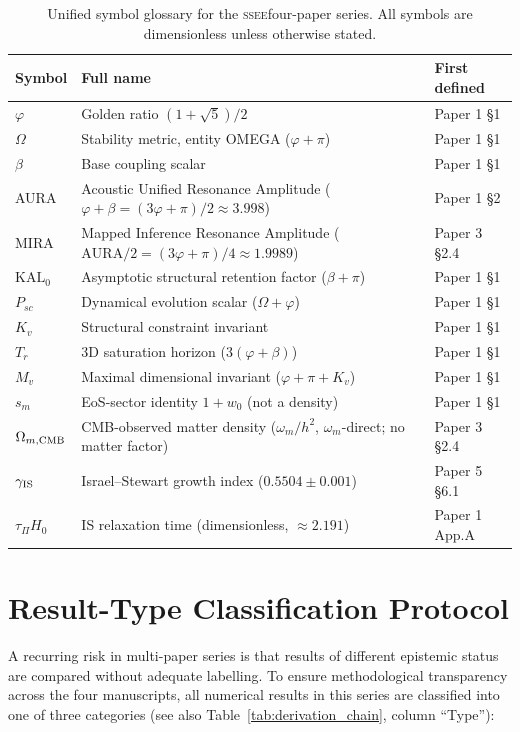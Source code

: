 \documentclass[12pt,a4paper]{article}
\newcommand{\SSEE}{\ifmmode\mathrm{SSEE}\else\textsc{ssee}\fi}
\begin{document}
\begin{table}[H]
\centering
\caption{Unified symbol glossary for the \SSEE four-paper series.
  All symbols are dimensionless unless otherwise stated.}
\label{tab:notation}
\footnotesize
\begin{tabularx}{\textwidth}{p{2.2cm}Xp{2.8cm}}
\toprule
Symbol & Full name & First defined \\
\midrule
$\varphi$ & Golden ratio $(1+\sqrt{5})/2$ & Paper 1 §1 \\
$\Omega$ & Stability metric, entity OMEGA ($\varphi+\pi$) & Paper 1 §1 \\
$\beta$ & Base coupling scalar & Paper 1 §1 \\
AURA & Acoustic Unified Resonance Amplitude ($\varphi+\beta=(3\varphi+\pi)/2\approx3.998$) & Paper 1 §2 \\
MIRA & Mapped Inference Resonance Amplitude ($\mathrm{AURA}/2=(3\varphi+\pi)/4\approx1.9989$) & Paper 3 §2.4 \\
$\mathrm{KAL}_0$ & Asymptotic structural retention factor ($\beta+\pi$) & Paper 1 §1 \\
$P_{sc}$ & Dynamical evolution scalar ($\Omega+\varphi$) & Paper 1 §1 \\
$K_v$ & Structural constraint invariant & Paper 1 §1 \\
$T_r$ & 3D saturation horizon ($3(\varphi+\beta)$) & Paper 1 §1 \\
$M_v$ & Maximal dimensional invariant ($\varphi+\pi+K_v$) & Paper 1 §1 \\
$s_m$ & EoS-sector identity $1+w_0$ (not a density) & Paper 1 §1 \\
$\Omega_{m,\rm CMB}$ & CMB-observed matter density ($\omega_m/h^2$, $\omega_m$-direct; no matter factor) & Paper 3 §2.4 \\
$\gamma_{\rm IS}$ & Israel--Stewart growth index ($0.5504\pm0.001$) & Paper 5 §6.1 \\
$\tau_\Pi H_0$ & IS relaxation time (dimensionless, $\approx2.191$) & Paper 1 App.A \\
\bottomrule
\end{tabularx}
\end{table}

\section{Result-Type Classification Protocol}
\label{app:result_types}

A recurring risk in multi-paper series is that results of different
epistemic status are compared without adequate labelling.
To ensure methodological transparency across the four manuscripts,
all numerical results in this series are classified into one of three
categories (see also Table~\ref{tab:derivation_chain}, column ``Type''):
\end{document}
